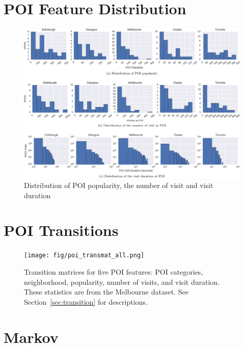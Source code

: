 \section{POI Feature Distribution}
\begin{figure}[t]
\includegraphics[width=\textwidth]{fig/feature_distro.pdf}
\caption{Distribution of POI popularity, the number of visit and visit duration}
\label{fig:distro}\captionmoveup
\end{figure}


\section{POI Transitions}
\begin{figure}[htbp]
\texttt{[image: fig/poi\_transmat\_all.png]}
\caption{Transition matrices for five POI features: POI categories, neighborhood, popularity, number of visits, and visit duration. These statistics are from the Melbourne dataset. See Section~\ref{sec:transition} for descriptions.}
\label{fig:transmat}
\end{figure}


\section{Markov}

